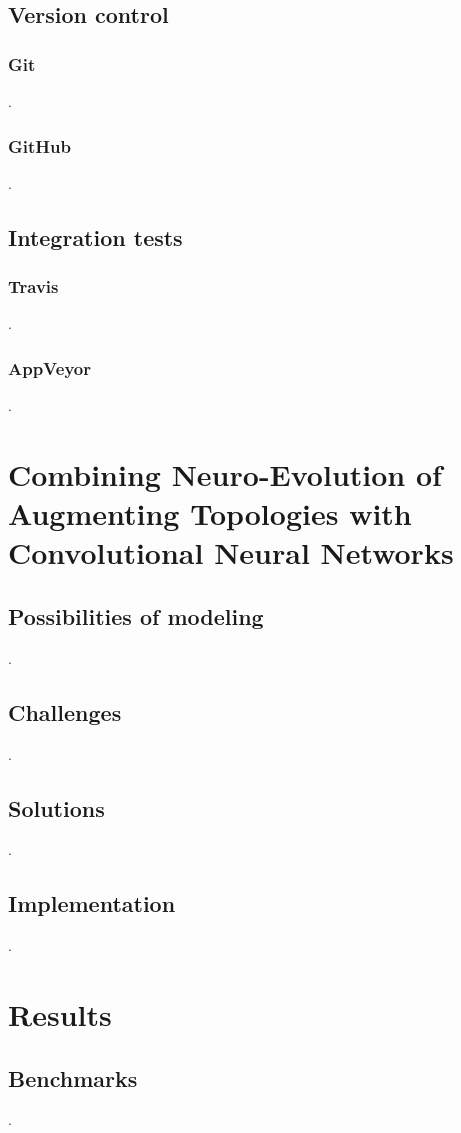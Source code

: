 \documentclass[11pt]{article}
\begin{document}
		\subsection{Version control}
			\subsubsection{Git}
				.
			\subsubsection{GitHub}
				.
		\subsection{Integration tests}
			\subsubsection{Travis}
				.
			\subsubsection{AppVeyor}
				.
	\newpage

	\section{Combining Neuro-Evolution of Augmenting Topologies with Convolutional Neural Networks}
		\subsection{Possibilities of modeling}
			.
		\subsection{Challenges}
			.
		\subsection{Solutions}
			.
		\subsection{Implementation}
			.
	\newpage

	\section{Results}
		\subsection{Benchmarks}
			.
	\newpage
\end{document}

